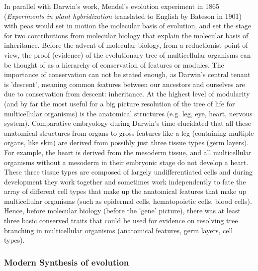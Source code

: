 In parallel with Darwin's work, Mendel's evolution experiment in 1865 (\textit{Experiments in plant hybridization} translated to English by Bateson in 1901\cite{mendel}) with peas would set in motion the molecular basis of evolution, and set the stage for two contributions from molecular biology that explain the molecular basis of inheritance.  Before the advent of molecular biology, from a reductionist point of view, the proof (evidence) of the evolutionary tree of multicellular organisms can be thought of as a hierarchy of conservation of features or modules.  The importance of conservation can not be stated enough, as Darwin's central tenant is 'descent', meaning common features between our ancestors and ourselves are due to conservation from descent: inheritance.  At the highest level of modularity (and by far the most useful for a big picture resolution of the tree of life for multicellular organisms) is the anatomical structures (e.g. leg, eye, heart, nervous system).  Comparative embryology during Darwin's time elucidated that all these anatomical structures from organs to gross features like a leg (containing multiple organs, like skin) are derived from possibly just three tissue types (germ layers).  For example, the heart is derived from the mesoderm tissue, and all multicellular organisms without a mesoderm in their embryonic stage do not develop a heart.  These three tissue types are composed of largely undifferentiated cells and during development they work together and sometimes work independently to fate the array of different cell types that make up the anatomical features that make up multicellular organisms (such as epidermal cells,  hematopoietic cells, blood cells).  Hence, before molecular biology (before the 'gene' picture), there was at least three basic conserved traits that could be used for evidence on resolving tree branching in multicellular organisms (anatomical features, germ layers, cell types).
    
\subsubsection{Modern Synthesis of evolution}

